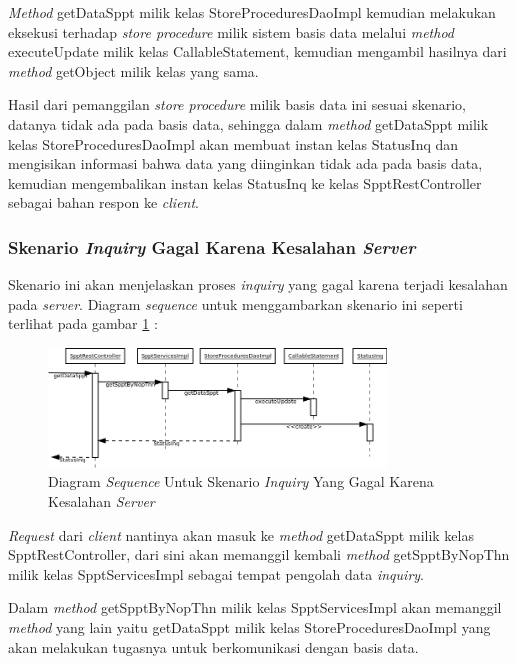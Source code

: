 \documentclass[pdftex,12pt, oneside]{article}
\begin{document}
\textit{Method} getDataSppt milik kelas StoreProceduresDaoImpl kemudian melakukan eksekusi terhadap \textit{store procedure} milik sistem basis data melalui \textit{method} executeUpdate milik kelas CallableStatement, kemudian mengambil hasilnya dari \textit{method} getObject milik kelas yang sama.

Hasil dari pemanggilan \textit{store procedure} milik basis data ini sesuai skenario, datanya tidak ada pada basis data, sehingga dalam \textit{method} getDataSppt milik kelas StoreProceduresDaoImpl akan membuat instan kelas StatusInq dan mengisikan informasi bahwa data yang diinginkan tidak ada pada basis data, kemudian mengembalikan instan kelas StatusInq ke kelas SpptRestController sebagai bahan respon ke \textit{client}.

\subsubsection{Skenario \textit{Inquiry} Gagal Karena Kesalahan \textit{Server}}

Skenario ini akan menjelaskan proses \textit{inquiry} yang gagal karena terjadi kesalahan pada \textit{server}. Diagram \textit{sequence} untuk menggambarkan skenario ini seperti terlihat pada gambar \ref{fig:uml-seq-inq-db-error} :

\begin{figure}[H]
  \centering
  \includegraphics[width=0.8\textwidth]{./resources/diagram/uml-seq-inq-db-error}
  \caption{Diagram \textit{Sequence} Untuk Skenario \textit{Inquiry} Yang Gagal Karena Kesalahan \textit{Server}}
  \label{fig:uml-seq-inq-db-error}
\end{figure}

\textit{Request} dari \textit{client} nantinya akan masuk ke \textit{method} getDataSppt milik kelas SpptRestController, dari sini akan memanggil kembali \textit{method} getSpptByNopThn milik kelas SpptServicesImpl sebagai tempat pengolah data \textit{inquiry}.

Dalam \textit{method} getSpptByNopThn milik kelas SpptServicesImpl akan memanggil \textit{method} yang lain yaitu getDataSppt milik kelas StoreProceduresDaoImpl yang akan melakukan tugasnya untuk berkomunikasi dengan basis data.
\end{document}
